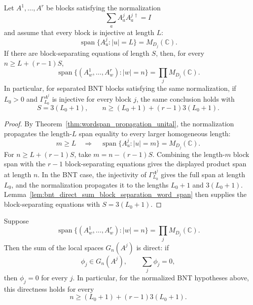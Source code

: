 \begin{lemma}
    \label{lem:unital_block_separating_product_span}
    \leanok
    Let \(A^1,\ldots,A^r\) be blocks satisfying the normalization
    \[
        \sum_a A^j_aA^{j\,\dagger}_a=I
    \]
    and assume that every block is injective at length \(L\):
    \[
        \operatorname{span}\{A^j_u:|u|=L\}=M_{D_j}(\mathbb C).
    \]
    If there are block-separating equations of length \(S\), then, for every
    \(n\ge L+(r-1)S\),
    \[
        \operatorname{span}\{(A^1_w,\ldots,A^r_w):|w|=n\}
        =
        \prod_j M_{D_j}(\mathbb C).
    \]
    In particular, for separated BNT blocks satisfying the same normalization,
    if \(L_0>0\) and \(\Gamma_{L_0}^{A^j}\) is injective for every block \(j\),
    the same conclusion holds with
    \[
        S=3(L_0+1),
        \qquad
        n\ge (L_0+1)+(r-1)3(L_0+1).
    \]
\end{lemma}

\begin{proof}
    \leanok
    By Theorem~\ref{thm:wordspan_propagation_unital}, the normalization
    propagates the length-\(L\) span equality to every larger homogeneous length:
    \[
        m\ge L
        \quad\Longrightarrow\quad
        \operatorname{span}\{A^j_u:|u|=m\}=M_{D_j}(\mathbb C).
    \]
    For \(n\ge L+(r-1)S\), take \(m=n-(r-1)S\). Combining the length-\(m\)
    block span with the \(r-1\) block-separating equations gives the displayed
    product span at length \(n\). In the BNT case, the injectivity of
    \(\Gamma_{L_0}^{A^j}\) gives the full span at length \(L_0\), and the
    normalization propagates it to the lengths \(L_0+1\) and \(3(L_0+1)\).
    Lemma~\ref{lem:bnt_direct_sum_block_separation_word_span} then supplies the
    block-separating equations with \(S=3(L_0+1)\).
\end{proof}

\begin{lemma}
    \label{lem:product_span_block_image_direct_sum}
    \leanok
    Suppose
    \[
        \operatorname{span}\{(A^1_w,\ldots,A^r_w):|w|=n\}
        =
        \prod_jM_{D_j}(\mathbb C).
    \]
    Then the sum of the local spaces \(G_n(A^j)\) is direct: if
    \[
        \phi_j\in G_n(A^j),
        \qquad
        \sum_j\phi_j=0,
    \]
    then \(\phi_j=0\) for every \(j\).  In particular, for the normalized BNT
    hypotheses above, this directness holds for every
    \[
        n\ge (L_0+1)+(r-1)3(L_0+1).
    \]
\end{lemma}

